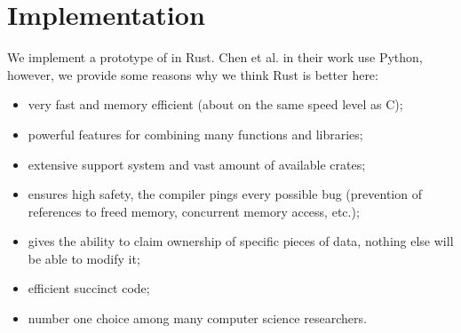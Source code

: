 \section{Implementation}
\label{sec:implementation}

We implement a prototype of \sys in Rust. Chen et al. \cite{DBLP:conf/sp/ChenCWSCF21} in their work use Python, however, we provide some reasons why we think Rust is better here: 
\begin{itemize}
	\item very fast and memory efficient (about on the same speed level as C);
	\item powerful features for combining many functions and libraries;
	\item extensive support system and vast amount of available crates;
	\item ensures high safety, the compiler pings every possible bug (prevention of references to freed memory, concurrent memory access, etc.);
	\item gives the ability to claim ownership of specific pieces of data, nothing else will be able to modify it;
	\item efficient succinct code;
	\item number one choice among many computer science researchers.
\end{itemize}